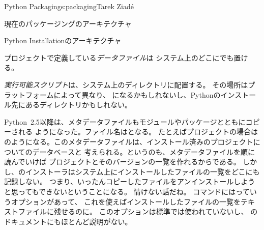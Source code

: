 \begin{aosachapter}{Python Packaging}{s:packaging}{Tarek Ziad\'{e}}
\begin{aosasect1}{現在のパッケージングのアーキテクチャ}
\begin{aosasect2}{Python Installationのアーキテクチャ}
\begin{aosaitemize}
  \item プロジェクトで定義している\emph{データファイル}は
  システム上のどこにでも置ける。

  \item \emph{実行可能スクリプト}は、システム上のディレクトリに配置する。
  その場所はプラットフォームによって異なり、
  になるかもしれないし、Pythonのインストール先にあるディレクトリかもしれない。

\end{aosaitemize}

Python~2.5以降は、メタデータファイルもモジュールやパッケージとともにコピーされる
ようになった。ファイル名はとなる。
たとえばプロジェクトの場合は
のようになる。このメタデータファイルは、インストール済みのプロジェクトについてのデータベースと
考えられる。というのも、メタデータファイルを順に読んでいけば
プロジェクトとそのバージョンの一覧を作れるからである。
しかし、のインストーラはシステム上にインストールしたファイルの一覧をどこにも記録しない。
つまり、いったんコピーしたファイルをアンインストールしようと思ってもできないということになる。
情けない話だね。
コマンドにはっていうオプションがあって、
これを使えばインストールしたファイルの一覧をテキストファイルに残せるのに。
このオプションは標準では使われていないし、
のドキュメントにもほとんど説明がない。


\end{aosasect2}
\end{aosasect1}
\end{aosachapter}
